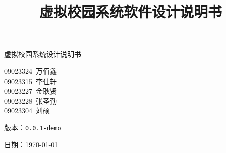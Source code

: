 \ifx\maindoc\undefined
{}
\fi
\title{虚拟校园系统软件设计说明书}



\begin{titlepage}
\vspace*{\fill}

\begin{center}
    {\Huge 虚拟校园系统设计说明书}

    \vspace{10cm}
{\large
09023324~万佰鑫 \\
09023315~李仕轩 \\
09023227~金耿贤 \\
09023228~张圣勤 \\
09023304~刘\phantom{刘}硕
}

    \vspace{0.5cm}
    {\large 版本：\texttt{0.0.1-demo}}

    
\vspace{0.5cm}


    {\large 日期：\today}
\end{center}

\vspace*{\fill}
\end{titlepage}